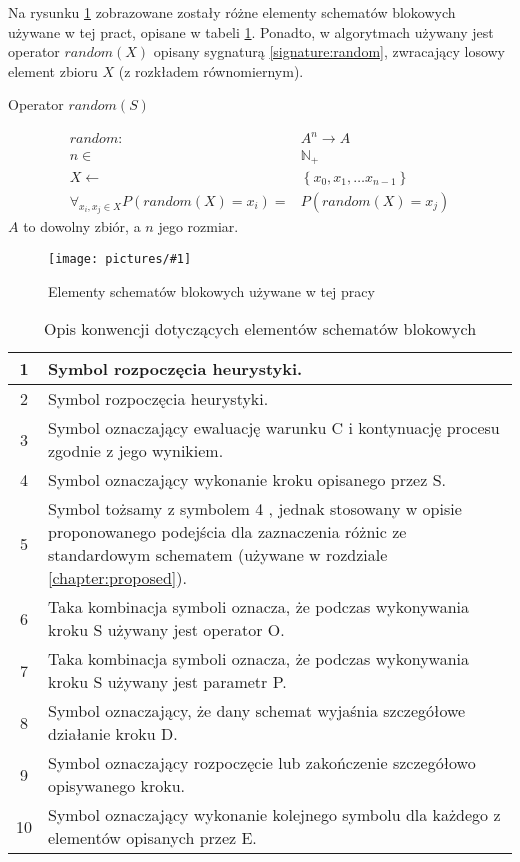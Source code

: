 \documentclass[twoside]{iisthesis}
\newcommand{\numberSet}{\mathbb}
\newcommand{\circled}[1]{ \textcircled{\scriptsize{#1}} }
\newcommand{\img}[1]{\texttt{[image: pictures/\#1]}}
\begin{document}
Na rysunku \ref{figure:flowchart_conventions} zobrazowane zostały różne elementy schematów blokowych używane w tej pract, opisane w tabeli \ref{table:flowchart_conventions}. Ponadto, w algorytmach używany jest operator $random(X)$ opisany sygnaturą \ref{signature:random}, zwracający losowy element zbioru $X$ (z rozkładem równomiernym).

\begin{signature}
	\caption{Operator $random(S)$ \label{signature:random}}
	\begin{align}
	random: &A^n \rightarrow A \\
	n \in &\numberSet{N}_{+} \\
	X \gets &\left\{ x_0, x_1, \dots x_{n-1} \right\} \\
	\forall_{x_i, x_j \in X} P(random(X) = x_i) = &P(random(X) = x_j)
	\end{align}
	$A$ to dowolny zbiór, a $n$ jego rozmiar.
\end{signature}

\begin{figure}[H]
	\caption{Elementy schematów blokowych używane w tej pracy \label{figure:flowchart_conventions}}
	\img{conventions.png}
\end{figure}

\begin{table}[H]
	\caption{Opis konwencji dotyczących elementów schematów blokowych \label{table:flowchart_conventions}}
	\begin{tabularx}{\linewidth}{|c|X|}
		\hline 
		\circled{1} & Symbol rozpoczęcia heurystyki. \\
		\hline
		\circled{2} & Symbol rozpoczęcia heurystyki. \\
		\hline
		\circled{3} & Symbol oznaczający ewaluację warunku C i kontynuację procesu zgodnie z jego wynikiem. \\
		\hline
		\circled{4} & Symbol oznaczający wykonanie kroku opisanego przez S. \\
		\hline
		\circled{5} & Symbol tożsamy z symbolem \circled{4}, jednak stosowany w opisie proponowanego podejścia dla zaznaczenia różnic ze standardowym schematem (używane w rozdziale \ref{chapter:proposed}).\\
		\hline
		\circled{6} & Taka kombinacja symboli oznacza, że podczas wykonywania kroku S używany jest operator O. \\
		\hline
		\circled{7} & Taka kombinacja symboli oznacza, że podczas wykonywania kroku S używany jest parametr P. \\
		\hline
		\circled{8} & Symbol oznaczający, że dany schemat wyjaśnia szczegółowe działanie kroku D. \\
		\hline
		\circled{9} & Symbol oznaczający rozpoczęcie lub zakończenie szczegółowo opisywanego kroku. \\
		\hline
		\circled{10} & Symbol oznaczający wykonanie kolejnego symbolu dla każdego z elementów opisanych przez E. \\
		\hline
	\end{tabularx}
\end{table}
\end{document}
